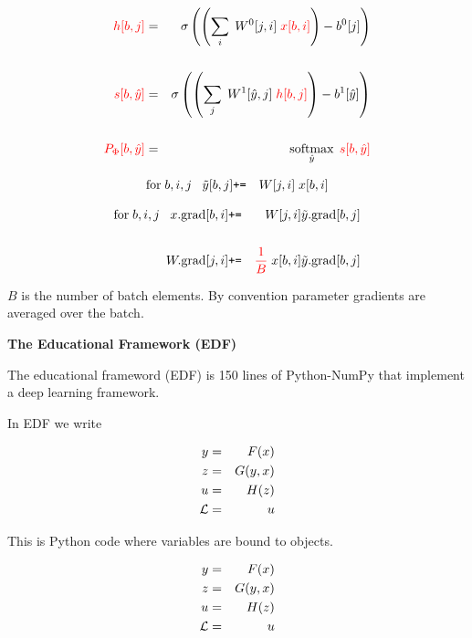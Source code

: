 {\vfill
\begin{eqnarray*}
  {\color{red} h[b,j]} & = & \sigma\left(\left(\sum_i\;W^0[j,i] \;{\color{red} x[b,i]}\right) - b^0[j]\right) \\
  \\
  {\color{red} s[b,\hat{y}]} & = & \sigma\left(\left(\sum_j\;W^1[\hat{y},j]\;{\color{red} h[b,j]}\right) - b^1[\hat{y}]\right) \\
  \\
  {\color{red} P_\Phi[b,\hat{y}]} & = & \operatorname*{softmax}_{\hat{y}}\;{\color{red} s[b,\hat{y}]}
\end{eqnarray*}

\vspace{-3ex}
\begin{eqnarray*}
  \mathrm{for}\;b,i,j\;\;\;\tilde{y}[b,j] & \mbox{\tt +=} & W[j,i]\;x[b,i]
\end{eqnarray*}

\begin{eqnarray*}
\mathrm{for}\;b,i,j\;\;\;  x.\mathrm{grad}[b,i] & \mbox{\tt +=} & W[j,i]\tilde{y}.\mathrm{grad}[b,j] \\
  \\
  W.\mathrm{grad}[j,i] & \mbox{\tt +=} & {\color{red} \frac{1}{B}}\;x[b,i]\tilde{y}.\mathrm{grad}[b,j]
\end{eqnarray*}

\vfill
$B$ is the number of batch elements.  By convention parameter gradients are averaged over the batch.

\slide{}
\centerline{\bf The Educational Framework (EDF)}

\slide{}

The educational frameword (EDF) is 150 lines of Python-NumPy that implement a deep learning framework.

\vfill
In EDF we write

\vfill
\begin{eqnarray*}
  y & = & F(x) \\
  z & = & G(y,x) \\
  u & = & H(z) \\
  {\cal L} &  = &  u
\end{eqnarray*}
\medskip

\vfill
This is Python code where variables are bound to objects.


\begin{eqnarray*}
  y & = & F(x) \\
  z & = & G(y,x) \\
  u & = & H(z) \\
  {\cal L} &  = &  u
\end{eqnarray*}

}
